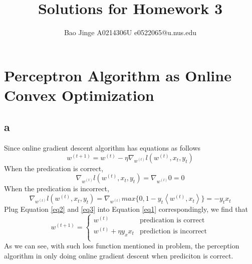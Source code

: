 \documentclass{article}
\author{Bao Jinge A0214306U e0522065@u.nus.edu}
\title{Solutions for Homework 3}
\date{}
\begin{document}
	\maketitle
	\section{Perceptron Algorithm as Online Convex Optimization}

	\subsection{a}
	Since online gradient descent algorithm has equations as follows
	\begin{equation}
	w^{(t+1)} = w^{(t)}-\eta\nabla_{w^{(t)}}l(w^{(t)},x_t,y_t)
	\label{eq1}
	\end{equation}
	When the predication is correct,
	\begin{equation}
	\nabla_{w^{(t)}}l(w^{(t)},x_t,y_t)=\nabla_{w^{(t)}}0=0
	\label{eq2}
	\end{equation}
	When the predication is incorrect,
	\begin{equation}
	\nabla_{w^{(t)}}l(w^{(t)},x_t,y_t)=\nabla_{w^{(t)}}max\{0,1-y_t\left<w^{(t)},x_t\right>\}=-y_tx_t
	\label{eq3}
	\end{equation}
	Plug Equation \ref{eq2} and \ref{eq3} into Equation \ref{eq1} correspondingly, we find that
	\label{eq0}
	\begin{equation}
	w^{(t+1)}=
	\begin{cases}
	w^{(t)} &\text{predication is correct}\\
	w^{(t)}+\eta y_xx_t &\text{prediction is incorrect}\\
	\end{cases}
	\label{eq4}
	\end{equation}
	As we can see, with such loss function mentioned in problem, the perception algorithm in only doing online gradient descent when prediciton is correct.
\end{document}

